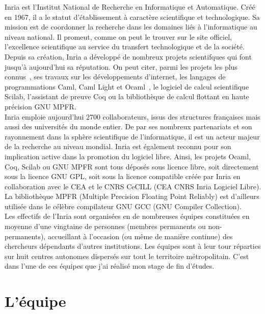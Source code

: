 \documentclass{report}
\begin{document}
Inria est l'Institut National de Recherche en Informatique et Automatique. Créé en 1967, il a le statut
d'établissement à caractère scientifique et technologique. Sa mission est de coordonner la recherche dans 
les domaines liés à l'informatique au niveau national. Il promeut, comme on peut le trouver sur le site officiel,
l'excellence scientifique au service du transfert technologique et de la société.
\\ Depuis sa création, Inria a développé de nombreux projets scientifques qui font jusqu'à aujourd'hui 
sa réputation.  On peut citer, parmi les projets les plus connus , ses travaux sur les développements 
d'internet, les langages de programmations Caml, Caml Light et Ocaml , le logiciel de calcul scientifique 
Scilab, l'assistant de preuve Coq ou la bibliothèque de calcul flottant en haute précision GNU MPFR.
\\ Inria emploie aujourd'hui 2700 collaborateurs, issus des structures françaises mais aussi des universités
du monde entier. De par ses nombreux partenariats et son rayonnement dans la sphère scientifique de 
l'informatique, il est un acteur majeur de la recherche au niveau mondial.
Inria est également reconnu pour son implication active dans la promotion du logiciel libre. Ainsi, les
projets Ocaml, Coq, Scilab ou GNU MPFR sont tous déposés sous licence libre, soit directement sous la 
licence GNU GPL, soit sous la licence compatible créée par Inria en collaboration avec le CEA et le CNRS
 CeCILL (CEA CNRS Inria Logiciel Libre). La bibliothèque MPFR (Multiple Precision Floating Point Reliably)
 est d'ailleurs utilisée dans le célèbre compilateur GNU GCC (GNU Compiler Collection).
\\ Les effectifs de l'Inria sont organisées en de nombreuses équipes constituées en moyenne d'une vingtaine
 de personnes (membres permanents ou non-permanents), accueillant à l'occasion (ou même de manière continue)
des chercheurs dépendants d'autres institutions. Les équipes sont à leur tour réparties sur huit centres 
autonomes dispersés sur tout le territoire métropolitain. C'est dans l'une de ces équipes que j'ai réalisé
mon stage de fin d'études.

\section{L'équipe}
\end{document}
